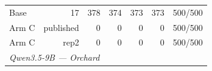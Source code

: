 \begin{table}[t]
{\begin{tabular}{lrrrrrr}
Base & 17 & 378 & 374 & 373 & 373 & 500/500 \\
Arm C & published & 0 & 0 & 0 & 0 & 500/500 \\
Arm C & rep2 & 0 & 0 & 0 & 0 & 500/500 \\
\midrule
\multicolumn{7}{l}{\textit{Qwen3.5-9B --- Orchard}} \\

\end{tabular}}
\end{table}
